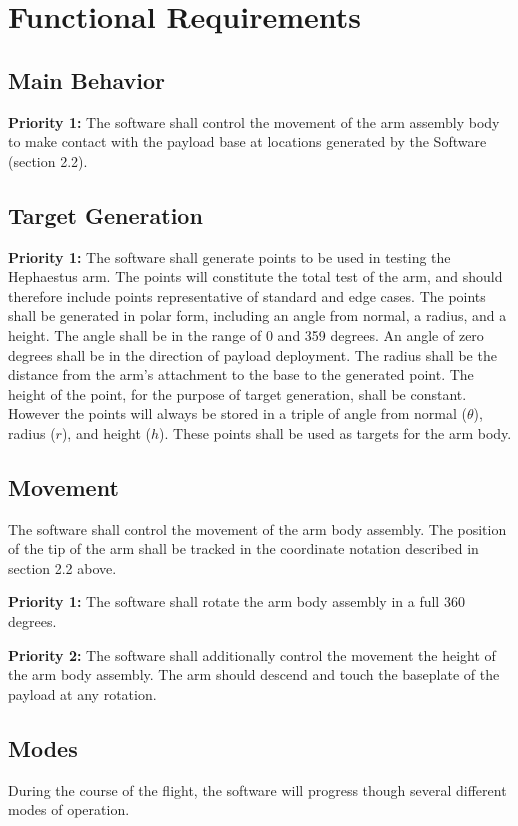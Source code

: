 \documentclass[letterpaper,10pt]{article}
\begin{document}
\section{Functional Requirements}

\subsection{Main Behavior}
\textbf{Priority 1:}
The software shall control the movement of the arm assembly body to make contact with the payload base
at locations generated by the Software (section 2.2). 

\subsection{Target Generation}
\textbf{Priority 1:}
The software shall generate points to be used in testing the Hephaestus arm.
The points will constitute the total test of the arm, and should therefore include points
representative of standard and edge cases.
The points shall be generated in polar form, including an angle from normal, a radius, and a height. 
The angle shall be in the range of 0 and 359 degrees.
An angle of zero degrees shall be in the direction of payload deployment.
The radius shall be the distance from the arm's attachment to the base to the generated point.
The height of the point, for the purpose of target generation, shall be constant.
However the points will always be stored in a triple of angle from normal (\(\theta\)), radius (\(r\)), and height (\(h\)).
These points shall be used as targets for the arm body.

\subsection{Movement}
The software shall control the movement of the arm body assembly. 
The position of the tip of the arm shall be tracked in the coordinate notation described in section 2.2 above.

\textbf{Priority 1:}
The software shall rotate the arm body assembly in a full 360 degrees.

\textbf{Priority 2:}
The software shall additionally control the movement the height of the arm body assembly.
The arm should descend and touch the baseplate of the payload at any rotation.

\subsection{Modes}
During the course of the flight, the software will progress though several different modes of operation.
\end{document}
